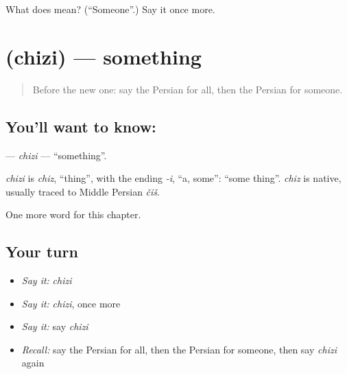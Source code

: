 \begin{tcolorbox}[breakable,colback=teal!4,colframe=teal!35!black,title={Before you move on}]
What does  mean? (\textquotedblleft{}Someone\textquotedblright{}.) Say it once more.
\end{tcolorbox}
\section[\texorpdfstring{\fa{چیزی} (chizi)}{چیزی (chizi)}]{ (chizi) — something}

\label{lesson:FA-C84-chizi}



\begin{quote}
Before the new one: say the Persian for all, then the Persian for someone.
\end{quote}

\subsection*{You'll want to know: }
\textbf{} — \emph{chizi} — \textquotedblleft{}something\textquotedblright{}.

\begin{cousinweb}
\emph{chizi} is \emph{chiz}, \textquotedblleft{}thing\textquotedblright{}, with the ending \emph{-i}, \textquotedblleft{}a, some\textquotedblright{}: \textquotedblleft{}some thing\textquotedblright{}. \emph{chiz} is native, usually traced to Middle Persian \emph{čiš}.
\end{cousinweb}

\begin{grammarlens}[title={What you've built}]
One more word for this chapter.
\end{grammarlens}

\subsection*{Your turn}
\begin{itemize}
\raggedright
  \item \emph{Say it:} \emph{chizi}
  \item \emph{Say it:} \emph{chizi}, once more
  \item \emph{Say it:} say \emph{chizi}
  \item \emph{Recall:} say the Persian for all, then the Persian for someone, then say \emph{chizi} again
\end{itemize}

